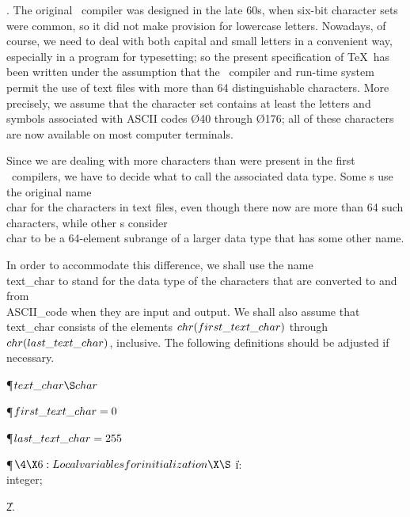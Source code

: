. The original \PASCAL\ compiler was designed in the late 60s, when six-bit
character sets were common, so it did not make provision for lowercase
letters. Nowadays, of course, we need to deal with both capital and small
letters in a convenient way, especially in a program for typesetting;
so the present specification of \TeX\ has been written under the assumption
that the \PASCAL\ compiler and run-time system permit the use of text files
with more than 64 distinguishable characters. More precisely, we assume that
the character set contains at least the letters and symbols associated
with ASCII codes \O{40} through \O{176}; all of these characters are now
available on most computer terminals.

Since we are dealing with more characters than were present in the first
\PASCAL\ compilers, we have to decide what to call the associated data
type. Some \PASCAL s use the original name \\{char} for the
characters in text files, even though there now are more than 64 such
characters, while other \PASCAL s consider \\{char} to be a 64-element
subrange of a larger data type that has some other name.

In order to accommodate this difference, we shall use the name \\{text\_char}
to stand for the data type of the characters that are converted to and
from \\{ASCII\_code} when they are input and output. We shall also assume
that \\{text\_char} consists of the elements $\\{chr}(\\{first\_text\_char})$
through
$\\{chr}(\\{last\_text\_char})$, inclusive. The following definitions should be
adjusted if necessary.

\Y\P\D {}$\\{text\_char}\S\\{char}$\par
\P\D {}$\\{first\_text\_char}=0$\par
\P\D {}$\\{last\_text\_char}=255$\par
\Y\P$\4\X6:Local variables for initialization\X\S$\6
\4\|i: \\{integer};\par
\U2.\fi

